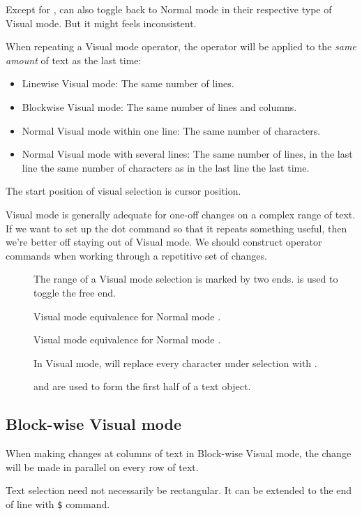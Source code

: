 Except for ,  can also toggle back to Normal mode in their respective type of Visual mode. But it might feels inconsistent.


When repeating a Visual mode operator, the operator will be applied to the
\emph{same amount} of text as the last time:
\begin{itemize}
  \item Linewise Visual mode: The same number of lines.
  \item Blockwise Visual mode: The same number of lines and columns.
  \item Normal Visual mode within one line: The same number of characters.
  \item Normal Visual mode with several lines: The same number of lines, in the last line the same number of characters as in the last line the last time.
\end{itemize}
The start position of visual selection is cursor position.

Visual mode is generally adequate for one-off changes on a complex range of text. If we want to set up the dot command so that it repeats something useful, then we're better off staying out of Visual mode. We should construct operator commands when working through a repetitive set of changes.

\begin{description}
  \item[] The range of a Visual mode selection is marked by two ends.  is used to toggle the free end.
  \item[] Visual mode equivalence for Normal mode .
  \item[] Visual mode equivalence for Normal mode .
  \item[] In Visual mode,  will replace every character under selection with .
  \item[]  and  are used to form the first half of a text object.
\end{description}

\subsection{Block-wise Visual mode}
When making changes at columns of text in Block-wise Visual mode, the change will be made in parallel on every row of text.

Text selection need not necessarily be rectangular. It can be extended to the end of line with \verb|$| command.

